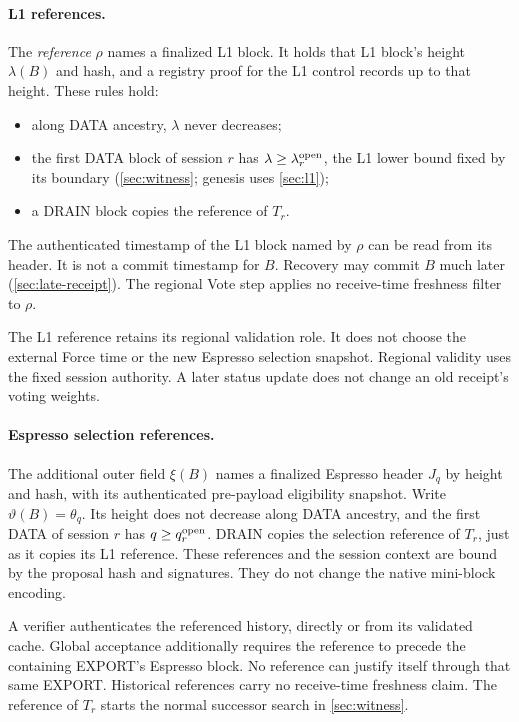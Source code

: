 \documentclass[11pt,a4paper]{article}
\newcommand{\defterm}[1]{\textcolor{rrBlue}{\textit{#1}}}
\begin{document}
\paragraph{L1 references.}
The \defterm{reference} $\rho$ names a finalized L1 block. It holds that L1
block's height $\lambda(B)$ and hash, and a registry proof for the L1
control records up to that height. These rules hold:
\begin{itemize}
\item along DATA ancestry, $\lambda$ never decreases;
\item the first DATA block of session $r$ has $\lambda\ge
\lambda^{\rm open}_r$, the L1 lower bound fixed by its boundary
(\cref{sec:witness}; genesis uses \cref{sec:l1});
\item a DRAIN block copies the reference of $T_r$.
\end{itemize}
The authenticated timestamp of the L1 block named by $\rho$ can be
read from its header. It is not a commit timestamp for $B$. Recovery
may commit $B$ much later (\cref{sec:late-receipt}). The
regional Vote step applies no receive-time freshness filter to $\rho$.

The L1 reference retains its regional validation role. It does not
choose the external Force time or the new Espresso selection snapshot.
Regional validity uses the fixed session authority. A later status update
does not change an old receipt's voting weights.

\paragraph{Espresso selection references.}
The additional outer field $\xi(B)$ names a finalized Espresso header
$J_q$ by height and hash, with its authenticated pre-payload eligibility
snapshot. Write $\vartheta(B)=\theta_q$. Its height does not decrease
along DATA ancestry, and the first DATA of session $r$ has
$q\ge q_r^{\rm open}$. DRAIN copies the selection reference of $T_r$,
just as it copies its L1 reference. These references and the session
context are bound by the proposal hash and signatures. They do not
change the native mini-block encoding.

A verifier authenticates the referenced history, directly or from its
validated cache. Global acceptance additionally requires the reference
to precede the containing EXPORT's Espresso block. No reference can
justify itself through that same EXPORT. Historical references carry no
receive-time freshness claim. The reference of $T_r$ starts the normal
successor search in \cref{sec:witness}.
\end{document}
